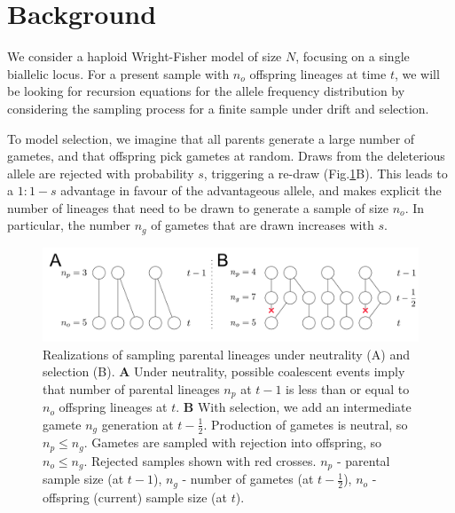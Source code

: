 \documentclass[review]{elsarticle}
\begin{document}

\section{Background}
\label{sec:background}

We consider a haploid Wright-Fisher model of size $N$, focusing on a single biallelic locus. For a
present sample with $n_o$ offspring lineages at time $t$, we will be looking for recursion equations
for the allele frequency distribution by considering the sampling process for a finite sample under drift 
and selection.   

To model selection, we imagine that all parents generate 
a large number of gametes, and that offspring pick gametes at random. Draws from the deleterious allele are 
rejected with probability $s$, triggering a re-draw (Fig.\ref{fig:schematic}B). This leads to a $1:1-s$ advantage 
in favour of the advantageous allele, and makes explicit the number of lineages that need to be drawn to 
generate a sample of size $n_o$.  
In particular, the number $n_g$ of gametes that are drawn increases with $s$. 

\begin{figure}[ht]
  \centering
  \includegraphics[width=1.0\textwidth]{fig/schematic.pdf}
  \caption{\label{fig:schematic} Realizations of sampling parental lineages under neutrality (A) and
    selection (B). \textbf{A} Under neutrality, possible coalescent events imply that number of
    parental lineages $n_p$ at $t-1$ is less than or equal to $n_o$ offspring lineages at $t$.
    \textbf{B} With selection, we add an intermediate gamete $n_g$ generation at $t-\frac{1}{2}$.
    Production of gametes is neutral, so $n_p\le n_g$. Gametes are sampled with rejection into
    offspring, so $n_o \le n_g$. Rejected samples shown with red crosses. $n_p$ - parental sample
    size (at $t-1$), $n_g$ - number of gametes (at $t-\frac{1}{2}$), $n_o$ - offspring (current)
    sample size (at $t$).}
\end{figure}
\end{document}

